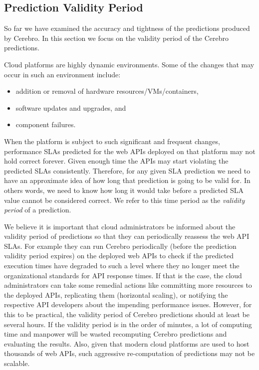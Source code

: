 \subsection{Prediction Validity Period}
So far we have examined the accuracy and tightness of the predictions produced by Cerebro. In this section we 
focus on the validity period of the Cerebro predictions.

Cloud platforms are highly dynamic environments. Some of the changes that may occur in such an environment include:
\begin{itemize}
\item addition or removal of hardware resources/VMs/containers,
\item software updates and upgrades, and
\item component failures.
\end{itemize}

When the platform is subject to such significant and frequent changes, performance SLAs predicted for the web APIs deployed on that
platform may not hold correct forever. Given enough time the APIs may start violating the predicted SLAs consistently. Therefore, for any
given SLA prediction we need to have an approximate idea of how long that prediction is going to be valid for. In others words, we need
to know how long it would take before a predicted SLA value cannot be considered correct. We refer to this time period as the 
\textit{validity period} of a prediction.


We believe
it is important that cloud administrators be informed about the validity period of predictions so that they can periodically reassess the web
API SLAs. For example they can run Cerebro periodically (before the prediction validity period expires) on the deployed web APIs to check
if the predicted execution times have degraded to such a level where they no longer meet the organizational standards for API
response times. If that is the case, the cloud administrators can take some remedial actions like committing more resources to the deployed APIs,
replicating them (horizontal scaling), or notifying the respective API developers about the impending performance issues. However,
for this to be practical, the validity period of Cerebro predictions should at least be several hours. If the validity period is in the order of minutes,
a lot of computing time and manpower will be wasted recomputing Cerebro predictions and evaluating the results. Also, given that
modern cloud platforms are used to host thousands of web APIs, such aggressive re-computation of predictions may not be scalable.

